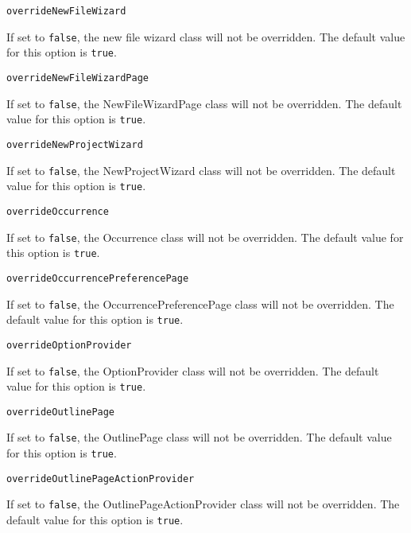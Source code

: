 \noindent\texttt{overrideNewFileWizard}
\begin{myindentpar}{1cm}
If set to \texttt{false}, the new file wizard class will not be overridden. The default value for this option is \texttt{true}.
\end{myindentpar}

\noindent\texttt{overrideNewFileWizardPage}
\begin{myindentpar}{1cm}
If set to \texttt{false}, the NewFileWizardPage class will not be overridden. The default value for this option is \texttt{true}.
\end{myindentpar}

\noindent\texttt{overrideNewProjectWizard}
\begin{myindentpar}{1cm}
If set to \texttt{false}, the NewProjectWizard class will not be overridden. The default value for this option is \texttt{true}.
\end{myindentpar}

\noindent\texttt{overrideOccurrence}
\begin{myindentpar}{1cm}
If set to \texttt{false}, the Occurrence class will not be overridden. The default value for this option is \texttt{true}.
\end{myindentpar}

\noindent\texttt{overrideOccurrencePreferencePage}
\begin{myindentpar}{1cm}
If set to \texttt{false}, the OccurrencePreferencePage class will not be overridden. The default value for this option is \texttt{true}.
\end{myindentpar}

\noindent\texttt{overrideOptionProvider}
\begin{myindentpar}{1cm}
If set to \texttt{false}, the OptionProvider class will not be overridden. The default value for this option is \texttt{true}.
\end{myindentpar}

\noindent\texttt{overrideOutlinePage}
\begin{myindentpar}{1cm}
If set to \texttt{false}, the OutlinePage class will not be overridden. The default value for this option is \texttt{true}.
\end{myindentpar}

\noindent\texttt{overrideOutlinePageActionProvider}
\begin{myindentpar}{1cm}
If set to \texttt{false}, the OutlinePageActionProvider class will not be overridden. The default value for this option is \texttt{true}.
\end{myindentpar}


